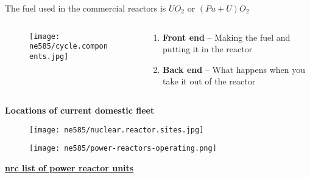 \documentclass[aspectratio=1610,pdftex,dvipsnames,compress,xcolor={dvipsnames}]{beamer}
\newcommand{\acs}{\acrshort} %
\begin{document}
\begin{frame}{The fuel used in the commercial reactors is $UO_2$ or $ (Pu+U)O_2$}
    \begin{columns}[t]

        \begin{column}{0.55\textwidth}
            \begin{figure}
                \centering
                \texttt{[image: ne585/cycle.components.jpg]}
            \end{figure}
        \end{column}

        \begin{column}{0.45\textwidth}
            \begin{enumerate}[series=outerlist,topsep=0pt,itemsep=21pt,leftmargin=*,label=(\arabic*)]
                \item[]\textbf{Front end} -- Making the fuel and putting it in the reactor
                \item[]\textbf{Back end} -- What happens when you take it out of the reactor
            \end{enumerate}
        \end{column}

    \end{columns}
\end{frame}


\begin{frame}[plain]{}
    \centering\LARGE\textbf{Locations of current domestic fleet}
\end{frame}


\addtocounter{framenumber}{-1} 
\begin{frame}{}
    \begin{figure}
        \centering
        \texttt{[image: ne585/nuclear.reactor.sites.jpg]}
    \end{figure}
\end{frame}


\begin{frame}{}
    \begin{figure}
        \centering
        \texttt{[image: ne585/power-reactors-operating.png]}
    \end{figure}
\end{frame}


\begin{frame}[plain]{}
    \centering\LARGE\textbf{\href{https://www.nrc.gov/reactors/operating/list-power-reactor-units.html}{\acs{nrc} list of power reactor units}}
\end{frame}
\end{document}
